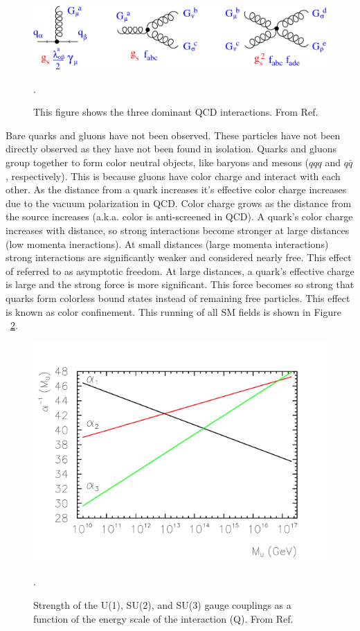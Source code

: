 \begin{figure}[h!]
  \centering
  \includegraphics[width=\hsize]{figures/Theory/QCD_vertices.png}
  \caption{This figure shows the three dominant QCD interactions. From Ref. \cite{pich}}. 
  \label{fig:QCDinteractions}
\end{figure}
\FloatBarrier


Bare quarks and gluons have not been observed. These particles have not been directly observed as they have not been found in isolation. Quarks and gluons group together to form color neutral objects, like baryons and mesons ($qqq$ and $q\bar{q}$, respectively). This is because gluons have color charge and interact with each other. As the distance from a quark increases it's effective color charge increases due to the vacuum polarization in QCD. Color charge grows as the distance from the source increases (a.k.a. color is anti-screened in QCD).  A quark's color charge increases with distance, so strong interactions become stronger at large distances (low momenta ineractions).  At small distances (large momenta interactions) strong interactions are significantly weaker and considered nearly free. This effect of referred to as asymptotic freedom. At large distances, a quark's effective charge is large and the strong force is more significant. This force becomes so strong that quarks form colorless bound states instead of remaining free particles. This effect is known as color confinement. This running of all SM fields is shown in Figure ~\ref{fig:sm_couplings}. 


\begin{figure}[h!]
  \centering
  \includegraphics[width=\hsize]{figures/Theory/runningcouplings.png}
  \caption{Strength of the U(1), SU(2), and SU(3) gauge couplings as a function of the energy scale of the interaction (Q). From Ref. \cite{runningcouplings}}. 
  \label{fig:sm_couplings}
\end{figure}
\FloatBarrier


